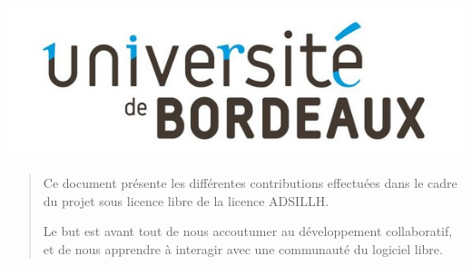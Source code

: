 \documentclass[12pt]{report}
\begin{document}
\begin{titlepage}
  \vspace{-0.1cm}
  \centering\includegraphics[scale=0.3]{images/logo_univ.jpg}
  
\end{titlepage}
\makeatother


\begin{abstract}
Ce document présente les différentes contributions effectuées dans le
cadre du projet sous licence libre de la licence ADSILLH.

Le but est avant tout de nous accoutumer au développement
collaboratif, et de nous apprendre à interagir avec une communauté
du logiciel libre.
\end{abstract}

\tableofcontents



\end{document}
